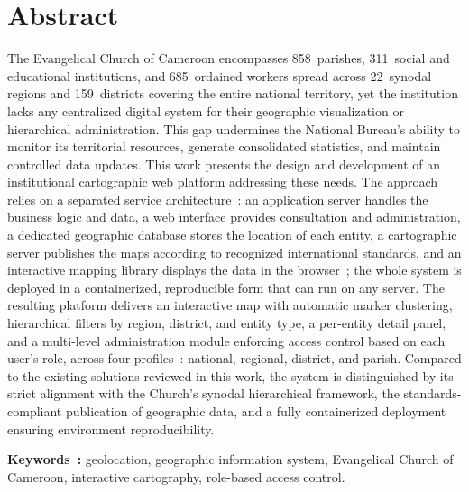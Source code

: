 \documentclass[12pt, a4paper]{report}
\begin{document}
\vspace{0.8cm}
\noindent{\color{eecgreen}\rule{\linewidth}{0.8pt}}
\vspace{0.3cm}

\chapter*{Abstract}

\noindent
The Evangelical Church of Cameroon encompasses 858~parishes, 311~social and
educational institutions, and 685~ordained workers spread across
22~synodal regions and 159~districts covering the entire national territory,
yet the institution lacks any centralized digital system for their geographic
visualization or hierarchical administration. This gap undermines the National
Bureau's ability to monitor its territorial resources, generate consolidated
statistics, and maintain controlled data updates. This work presents the design
and development of an institutional cartographic web platform addressing these
needs. The approach relies on a separated service architecture~: an application
server handles the business logic and data, a web interface provides
consultation and administration, a dedicated geographic database stores the
location of each entity, a cartographic server publishes the maps according to
recognized international standards, and an interactive mapping library displays
the data in the browser~; the whole system is deployed in a containerized,
reproducible form that can run on any server. The resulting platform delivers
an interactive map with automatic marker clustering, hierarchical filters by
region, district, and entity type, a per-entity detail panel, and a
multi-level administration module enforcing access control based on each
user's role, across four profiles~: national, regional, district, and parish.
Compared to the existing solutions reviewed in this work, the system is
distinguished by its strict alignment with the Church's synodal hierarchical
framework, the standards-compliant publication of geographic data, and a
fully containerized deployment ensuring environment reproducibility.

\smallskip
\noindent\textbf{Keywords~:}
geolocation, geographic information system, Evangelical Church of Cameroon,
interactive cartography, role-based access control.
\end{document}
